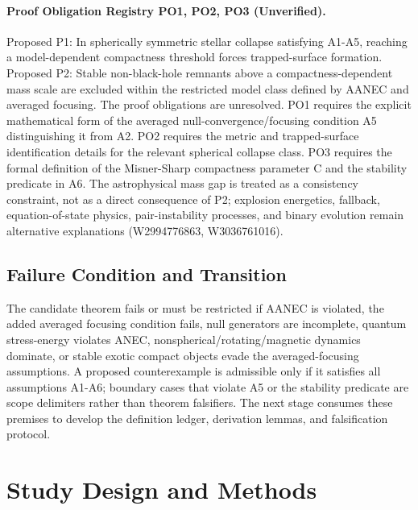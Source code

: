 \documentclass[conference]{IEEEtran}
\begin{document}
\paragraph{Proof Obligation Registry PO1, PO2, PO3 (Unverified).} Proposed P1: In spherically symmetric stellar collapse satisfying A1-A5, reaching a model-dependent compactness threshold forces trapped-surface formation. Proposed P2: Stable non-black-hole remnants above a compactness-dependent mass scale are excluded within the restricted model class defined by AANEC and averaged focusing. The proof obligations are unresolved. PO1 requires the explicit mathematical form of the averaged null-convergence/focusing condition A5 distinguishing it from A2. PO2 requires the metric and trapped-surface identification details for the relevant spherical collapse class. PO3 requires the formal definition of the Misner-Sharp compactness parameter C and the stability predicate in A6. The astrophysical mass gap is treated as a consistency constraint, not as a direct consequence of P2; explosion energetics, fallback, equation-of-state physics, pair-instability processes, and binary evolution remain alternative explanations (W2994776863, W3036761016).~\cite{cite_7a407c865faafd11,cite_f634820e22d7a238}

\subsection{Failure Condition and Transition}
The candidate theorem fails or must be restricted if AANEC is violated, the added averaged focusing condition fails, null generators are incomplete, quantum stress-energy violates ANEC, nonspherical/rotating/magnetic dynamics dominate, or stable exotic compact objects evade the averaged-focusing assumptions. A proposed counterexample is admissible only if it satisfies all assumptions A1-A6; boundary cases that violate A5 or the stability predicate are scope delimiters rather than theorem falsifiers. The next stage consumes these premises to develop the definition ledger, derivation lemmas, and falsification protocol.

\section{Study Design and Methods}
\end{document}
